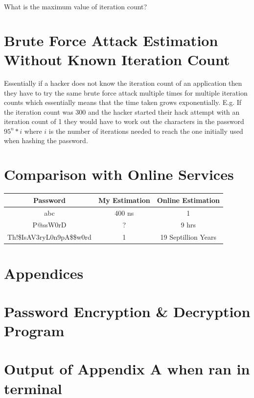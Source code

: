 \documentclass[a4paper, twoside, 11pt]{article}
\begin{document}
What is the maximum value of iteration count?

\section{Brute Force Attack Estimation Without Known Iteration Count}
Essentially if a hacker does not know the iteration count of an application then they have to try the same brute
force attack multiple times for multiple iteration counts which essentially means that the time taken grows exponentially.
E.g. If the iteration count was 300 and the hacker started their hack attempt with an iteration count of 1 they would have
to work out the characters in the password $95^n*i$ where $i$ is the number of iterations needed to reach the one initially
used when hashing the password.



\section{Comparison with Online Services}
\begin{center}
	\begin{tabular}{ |c|c|c| } 
	 \hline
	 Password & My Estimation & Online Estimation  \\
	 \hline
	 abc & 400 ns & 1 \\ 
	 P@ssW0rD & ? & 9 hrs \\ 
	 Th!\$IsAV3ryL0n9pA\$\$w0rd & 1 & 19 Septillion Years \\ 
	 \hline
	\end{tabular}
\end{center}

\newpage
\section*{Appendices}
\appendix
\section{Password Encryption \& Decryption Program}

\newpage
\section{Output of Appendix A when ran in terminal}

\end{document}
